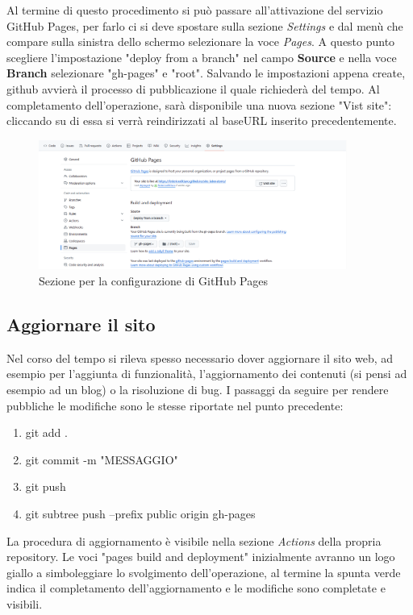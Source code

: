 \documentclass[target=bach,aauheader=]{thud}
\begin{document}
Al termine di questo procedimento si può passare all'attivazione del servizio GitHub Pages, per farlo ci si deve spostare sulla sezione \textit{Settings} e dal menù che compare sulla sinistra dello schermo selezionare la voce \textit{Pages}.
A questo punto scegliere l'impostazione "deploy from a branch" nel campo \textbf{Source} e nella voce \textbf{Branch} selezionare "gh-pages" e "root".
\newline
Salvando le impostazioni appena create, github avvierà il processo di pubblicazione il quale richiederà del tempo. Al completamento dell'operazione, sarà disponibile una nuova sezione "Vist site": 
cliccando su di essa si verrà reindirizzati al baseURL inserito precedentemente. 

\begin{figure}[b]
    \centering
    \includegraphics[width = 0.9\textwidth]{images/githubpages.png}
    \caption{Sezione per la configurazione di GitHub Pages}
\end{figure}

\subsection{Aggiornare il sito}
Nel corso del tempo si rileva spesso necessario dover aggiornare il sito web, ad esempio per l'aggiunta di funzionalità, l'aggiornamento dei contenuti (si pensi ad esempio ad un blog) o la risoluzione di bug. 
I passaggi da seguire per rendere pubbliche le modifiche sono le stesse riportate nel punto precedente:
\begin{enumerate}
    \item git add .
    \item git commit -m "MESSAGGIO"
    \item git push
    \item git subtree push --prefix public origin gh-pages
\end{enumerate}
La procedura di aggiornamento è visibile nella sezione \textit{Actions} della propria repository. Le voci "pages build and deployment" inizialmente avranno un logo giallo a simboleggiare lo svolgimento dell'operazione, 
al termine la spunta verde indica il completamento dell'aggiornamento e le modifiche sono completate e visibili. 
\end{document}
